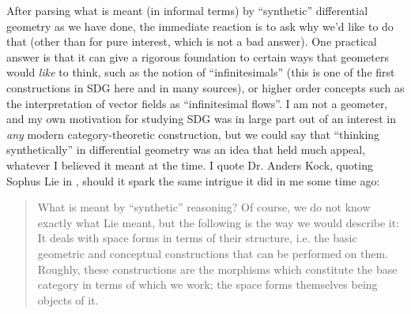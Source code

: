 After parsing what is meant (in informal terms) by ``synthetic'' differential geometry as we have done, the immediate reaction is to ask why we'd like to do that (other than for pure interest, which is not a bad answer). One practical answer is that it can give a rigorous foundation to certain ways that geometers would \emph{like} to think, such as the notion of ``infinitesimals'' (this is one of the first constructions in SDG here and in many sources), or higher order concepts such as the interpretation of vector fields as ``infinitesimal flows''. I am not a geometer, and my own motivation for studying SDG was in large part out of an interest in \emph{any} modern category-theoretic construction, but we could say that ``thinking synthetically'' in differential geometry was an idea that held much appeal, whatever I believed it meant at the time. I quote Dr. Anders Kock, quoting Sophus Lie in \cite{kock06}, should it spark the same intrigue it did in me some time ago:
\begin{quote}
  What is meant by “synthetic” reasoning? Of course, we do not know exactly what Lie meant, but the following is the way we would describe it: It deals with space forms in terms of their structure, i.e. the basic geometric and conceptual constructions that can be performed on them. Roughly, these constructions are the morphisms which constitute the base category in terms of which we work; the space forms themselves being objects of it.
\end{quote}
